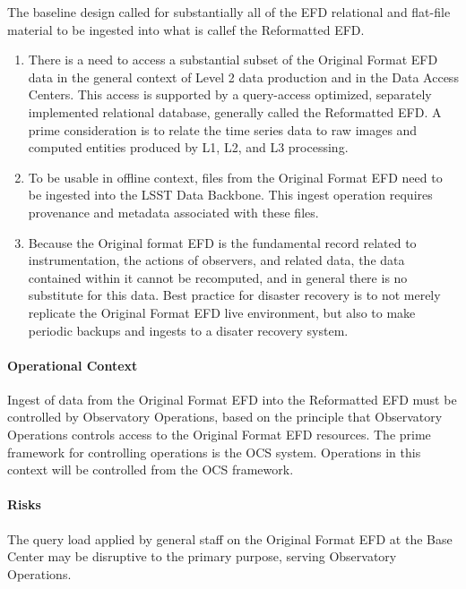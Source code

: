 The baseline design called for substantially all of the EFD relational
and flat-file material to be ingested into what is callef the Reformatted
EFD.

\begin{enumerate}

\item There is a need to access a substantial subset of the Original Format
EFD data in the general context of Level 2 data production and in the
Data Access Centers. This access is supported by a query-access
optimized, separately implemented relational database, generally
called the Reformatted EFD. A prime consideration is to relate the
time series data to raw images and computed entities produced by L1,
L2, and L3 processing.

\item To be usable in offline context, files from the Original Format EFD
need to be ingested into the LSST Data Backbone. This ingest operation
requires provenance and metadata associated with these files.

\item Because the Original format EFD is the fundamental record related to
instrumentation, the actions of observers, and related data, the data
contained within it cannot be recomputed, and in general there is no
substitute for this data. Best practice for disaster recovery is to
not merely replicate the Original Format EFD live environment, but also
to make periodic backups and ingests to a disater recovery system.

\end{enumerate}

\paragraph{Operational Context}

Ingest of data from the Original Format EFD into the Reformatted EFD
must be controlled by Observatory Operations, based on the principle
that Observatory Operations controls access to the Original Format EFD
resources. The prime framework for controlling operations is the OCS
system. Operations in this context will be controlled from the OCS
framework.

\paragraph{Risks}

The query load applied by general staff on the Original Format
EFD at the Base Center may be disruptive to the primary purpose,
serving Observatory Operations.

